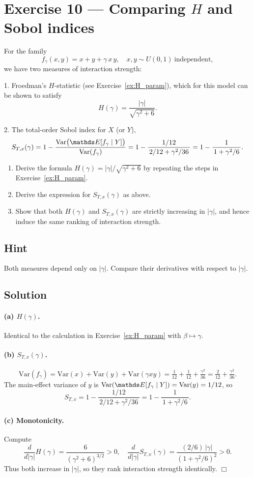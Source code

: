 \documentclass[a4paper]{article}
\begin{document}
\section*{Exercise 10 — Comparing $H$ and Sobol indices}
\label{ex:H_vs_Sobol_improved}

For the family
\[
f_\gamma(x,y)=x + y + \gamma\,x\,y,
\quad
x,y\sim U(0,1)\ \text{independent},
\]
we have two measures of interaction strength:

1. Froedman’s $H$‐statistic (see Exercise~\ref{ex:H_param}), which for this model
   can be shown to satisfy
   \[
   H(\gamma) = \frac{|\gamma|}{\sqrt{\gamma^2 + 6}}.
   \]

2. The total‐order Sobol index for $X$ (or $Y$),
   \[
   S_{T,x}(\gamma)
   = 1 - \frac{\text{Var}\bigl(\E[f_\gamma\mid Y]\bigr)}{\text{Var}(f_\gamma)}
   = 1 - \frac{1/12}{\,2/12 + \gamma^2/36\,}
   = 1 - \frac{1}{\,1 + \gamma^2/6\,}.
   \]

\begin{enumerate}%
  \item Derive the formula $H(\gamma)=|\gamma|/\sqrt{\gamma^2+6}$ by
        repeating the steps in Exercise~\ref{ex:H_param}.
  \item Derive the expression for $S_{T,x}(\gamma)$ as above.
  \item Show that both $H(\gamma)$ and $S_{T,x}(\gamma)$ are strictly
        increasing in $|\gamma|$, and hence induce the same ranking of
        interaction strength.
\end{enumerate}

\subsection*{Hint}
Both measures depend only on $|\gamma|$.  Compare their derivatives
with respect to $|\gamma|$.

\subsection*{Solution}

\paragraph{(a) $H(\gamma)$.}
Identical to the calculation in Exercise~\ref{ex:H_param} with
$\beta\mapsto\gamma$.

\paragraph{(b) $S_{T,x}(\gamma)$.}
\[
\text{Var}(f_\gamma)
= \text{Var}(x)+\text{Var}(y)+\text{Var}(\gamma xy)
= \tfrac1{12}+\tfrac1{12}+\tfrac{\gamma^2}{36}
= \tfrac{2}{12} + \tfrac{\gamma^2}{36}.
\]
The main‐effect variance of $y$ is $\text{Var}(\E[f_\gamma\mid Y])=\text{Var}(y)=1/12$, so
\[
S_{T,x} = 1 - \frac{1/12}{\,2/12 + \gamma^2/36\,}
= 1 - \frac{1}{\,1 + \gamma^2/6\,}.
\]

\paragraph{(c) Monotonicity.}
Compute
\[
\frac{d}{d|\gamma|}H(\gamma)
= \frac{6}{(\gamma^2+6)^{3/2}}>0,
\quad
\frac{d}{d|\gamma|}S_{T,x}(\gamma)
= \frac{(2/6)\,|\gamma|}{(1+\gamma^2/6)^2}>0.
\]
Thus both increase in $|\gamma|$, so they rank interaction strength
identically.  \hfill\(\Box\)
\end{document}
